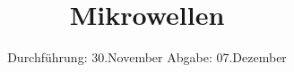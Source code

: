 

\subject{Fortgeschrittenen Praktikum -- WS 15/16}
\title{Mikrowellen}
\date{
  Durchführung: 30.November
  \hspace{3em}
  Abgabe: 07.Dezember
}



\maketitle
\thispagestyle{empty}
\tableofcontents
\printbibliography
\newpage









